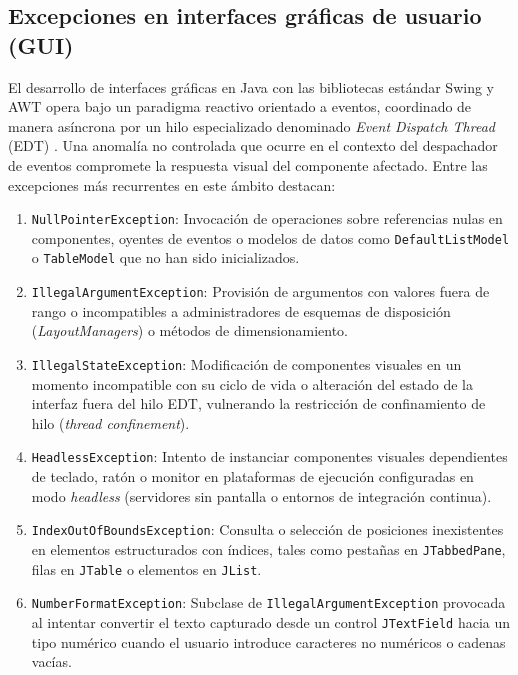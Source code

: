 \documentclass[letterpaper,12pt,oneside]{article}
\numberwithin{figure}{section}
\begin{document}
\subsection{Excepciones en interfaces gráficas de usuario (GUI)}
El desarrollo de interfaces gráficas en Java con las bibliotecas estándar Swing y AWT opera bajo un paradigma reactivo orientado a eventos, coordinado de manera asíncrona por un hilo especializado denominado \textit{Event Dispatch Thread} (EDT) \cite{oracleexceptions}. Una anomalía no controlada que ocurre en el contexto del despachador de eventos compromete la respuesta visual del componente afectado. Entre las excepciones más recurrentes en este ámbito destacan:
\begin{enumerate}
  \item \texttt{NullPointerException}: Invocación de operaciones sobre referencias nulas en componentes, oyentes de eventos o modelos de datos como \texttt{DefaultListModel} o \texttt{TableModel} que no han sido inicializados.
  \item \texttt{IllegalArgumentException}: Provisión de argumentos con valores fuera de rango o incompatibles a administradores de esquemas de disposición (\textit{LayoutManagers}) o métodos de dimensionamiento.
  \item \texttt{IllegalStateException}: Modificación de componentes visuales en un momento incompatible con su ciclo de vida o alteración del estado de la interfaz fuera del hilo EDT, vulnerando la restricción de confinamiento de hilo (\textit{thread confinement}).
  \item \texttt{HeadlessException}: Intento de instanciar componentes visuales dependientes de teclado, ratón o monitor en plataformas de ejecución configuradas en modo \textit{headless} (servidores sin pantalla o entornos de integración continua).
  \item \texttt{IndexOutOfBoundsException}: Consulta o selección de posiciones inexistentes en elementos estructurados con índices, tales como pestañas en \texttt{JTabbedPane}, filas en \texttt{JTable} o elementos en \texttt{JList}.
  \item \texttt{NumberFormatException}: Subclase de \texttt{IllegalArgumentException} provocada al intentar convertir el texto capturado desde un control \texttt{JTextField} hacia un tipo numérico cuando el usuario introduce caracteres no numéricos o cadenas vacías.
\end{enumerate}
\end{document}
